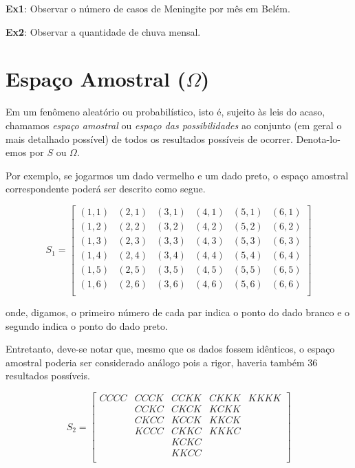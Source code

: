 \documentclass[a4paper,12pt]{report}
\begin{document}
{\textbf{Ex1}: Observar o número de casos de Meningite por mês em
Belém. \vskip0.3cm

\textbf{Ex2}: Observar a quantidade de chuva mensal.\vskip0.3cm




\section{Espaço Amostral ($\Omega$)}

Em um fenômeno aleatório ou probabilístico, isto é, sujeito às
leis do acaso, chamamos \emph{espaço amostral} ou \emph{espaço das
possibilidades} ao conjunto (em geral o mais detalhado possível)
de todos os resultados possíveis de ocorrer. Denota-lo-emos por
$S$ ou $\Omega$.\vskip0.3cm

Por exemplo, se jogarmos um dado vermelho e um dado preto, o
espaço amostral correspondente poderá ser descrito como segue.

$$
S_{1} =
\left[%
\begin{array}{cccccc}
  (1,1) & (2,1) & (3,1) & (4,1) & (5,1) & (6,1) \\
  (1,2) & (2,2) & (3,2) & (4,2) & (5,2) & (6,2) \\
  (1,3) & (2,3) & (3,3) & (4,3) & (5,3) & (6,3) \\
  (1,4) & (2,4) & (3,4) & (4,4) & (5,4) & (6,4) \\
  (1,5) & (2,5) & (3,5) & (4,5) & (5,5) & (6,5) \\
  (1,6) & (2,6) & (3,6) & (4,6) & (5,6) & (6,6) \\
\end{array}%
\right]
$$

onde, digamos, o primeiro número de cada par indica o ponto do
dado branco e o segundo indica o ponto do dado preto.\vskip0.3cm

Entretanto, deve-se notar que, mesmo que os dados fossem
idênticos, o espaço amostral poderia ser considerado análogo pois
a rigor, haveria também 36 resultados possíveis.


$$
S_{2} =
\left[%
\begin{array}{ccccc}
  CCCC  & CCCK  & CCKK  & CKKK  & KKKK \\
        & CCKC  & CKCK  & KCKK  &      \\
        & CKCC  & KCCK  & KKCK  &      \\
        & KCCC  & CKKC  & KKKC  &      \\
        &       & KCKC  &       &      \\
        &       & KKCC  &       &      \\
\end{array}%
\right]
$$

}
\end{document}
